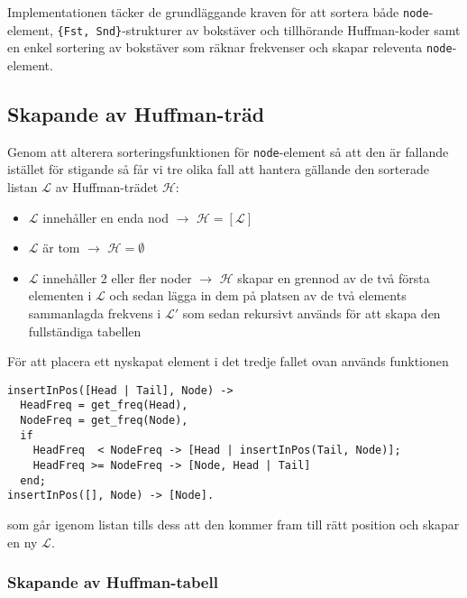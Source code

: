 \documentclass[a4paper, 11pt]{article}
\begin{document}
Implementationen täcker de grundläggande kraven för att sortera både \texttt{node}-element, \texttt{\{Fst, Snd\}}-strukturer av bokstäver och tillhörande Huffman-koder samt en enkel sortering av bokstäver som räknar frekvenser och skapar releventa \texttt{node}-element.

\subsection{Skapande av Huffman-träd}
Genom att alterera sorteringsfunktionen för \texttt{node}-element så att den är fallande istället för stigande så får vi tre olika fall att hantera gällande den sorterade listan $\mathcal{L}$ av Huffman-trädet $\mathcal{H}$:

\begin{itemize}
\item $\mathcal{L}$ innehåller en enda nod $\rightarrow$ $\mathcal{H} = [\mathcal{L}]$
\item $\mathcal{L}$ är tom $\rightarrow$ $\mathcal{H} = \emptyset$
\item $\mathcal{L}$ innehåller 2 eller fler noder $\rightarrow$ $\mathcal{H}$ skapar en grennod av de två första elementen i $\mathcal{L}$ och sedan lägga in dem på platsen av de två elements sammanlagda frekvens i $\mathcal{L}'$ som sedan rekursivt används för att skapa den fullständiga tabellen
\end{itemize}

För att placera ett nyskapat element i det tredje fallet ovan används funktionen 

\begin{lstlisting}
insertInPos([Head | Tail], Node) ->                                             
  HeadFreq = get_freq(Head),                                                  
  NodeFreq = get_freq(Node),                                                  
  if                                                                          
    HeadFreq  < NodeFreq -> [Head | insertInPos(Tail, Node)];               
    HeadFreq >= NodeFreq -> [Node, Head | Tail]                             
  end;                                                                        
insertInPos([], Node) -> [Node].
\end{lstlisting}

som går igenom listan tills dess att den kommer fram till rätt position och skapar en ny $\mathcal{L}$.

\subsubsection{Skapande av Huffman-tabell}
\end{document}
